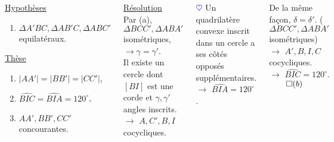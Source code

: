 \documentclass[10pt]{beamer}
\def \heart {\textcolor{blue}{$\heartsuit$} }
\def \deg {^{\circ}}
\begin{document}
{\begin{columns}[t]
\begin{figure}[h]
\begin{tikzpicture}[scale=0.5]
				  \end{tikzpicture}
				  \end{figure}
				  \vspace{-3mm}
				  \begin{tcolorbox}[basic] 
				      
				    \smallskip
				    \underline{Hypothèses} 
				    \begin{enumerate}
				    \item $\Delta A'BC,\Delta AB'C,\Delta ABC'$ equilatéraux.
				    \end{enumerate}
							      
				    \underline{Thèse}
				    \renewcommand{\theenumi}{\alph{enumi})}
				    \begin{enumerate}
				    \item $|AA'|=|BB'| = |CC'|$,
				    \item $\widehat{BIC}=\widehat{BIA}=120\deg$,
				    \item $AA',BB',CC'$ concourantes.
				    \end{enumerate}

				    \end{tcolorbox}
		
		
		\centering
		
		\underline{Résolution}\\ \flushleft
		\onslide<+->Par (a), \\ \smallskip 
		$\Delta BCC', \Delta ABA'$ isométriques, \\ \smallskip
		$\rightarrow \gamma = \gamma '$.  \\ \medskip
		Il existe un cercle dont $[BI]$ est une corde et $\gamma,\gamma '$ angles inscrits. \\
		$\rightarrow$ $A,C',B,I$ cocycliques. \\ \medskip
		
		\heart Un quadrilatère convexe inscrit dans un cercle a ses côtés opposés supplémentaires. \\ \medskip
		$\rightarrow$ $\widehat{BIA}=120\deg$. \\ \bigskip
		
		\onslide<+-> De la même façon,
		$\delta = \delta '$. ($\Delta BCC', \Delta ABA'$ isométriques) \\ \medskip
		$\rightarrow$ $A',B,I,C$ cocycliques. \\ \medskip
		$\rightarrow$ $\widehat{BIC}=120\deg$. \hfill $\qed(b)$
		
		
	   \end{columns}   
    }
    
\end{document}
